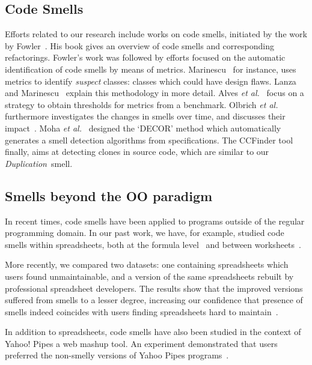 \documentclass{sig-alternate}
\newcommand{\dup}{\emph{Duplication}~}
\begin{document}
\subsection{Code Smells}
Efforts related to our research include works on code smells, initiated by the work by Fowler~\cite{fowler_refactoring:_1999}. His book gives an overview of code smells and corresponding refactorings. Fowler's work was followed by efforts focused on the automatic identification of code smells by means of metrics. Marinescu~\cite{marinescu_detecting_2001} for instance, uses metrics to identify \emph{suspect} classes: classes which could have design flaws. Lanza and Marinescu~\cite{lanza_object-oriented_2006} explain this methodology in more detail. Alves \emph{et al.}~\cite{alves_deriving_2010} focus on a strategy to obtain thresholds for metrics from a benchmark. Olbrich \emph{et al.} furthermore investigates the changes in smells over time, and discusses their impact~\cite{olbrich_evolution_2009}. Moha \emph{et al.}~\cite{moha_decor:_2010} designed the `DECOR' method which automatically generates a smell detection algorithms from specifications. The CCFinder tool~\cite{kamiya_ccfinder:_2002} finally, aims at detecting clones in source code, which are similar to our \dup smell.

\subsection{Smells beyond the OO paradigm}
In recent times, code smells have been applied to programs outside of the regular programming domain. In our past work, we have, for example, studied code smells within spreadsheets, both at the formula level~\cite{hermans_detecting_2014} and between worksheets~\cite{hermans_detecting_2012}.

More recently, we compared two datasets: one containing spreadsheets which users found unmaintainable, and a version of the same spreadsheets rebuilt by professional spreadsheet developers. The results show that the improved versions suffered from smells to a lesser degree, increasing our confidence that presence of smells indeed coincides with users finding spreadsheets hard to maintain~\cite{jansen_code_2015}.

In addition to spreadsheets, code smells have also been studied in the context of Yahoo! Pipes a web mashup tool. An experiment demonstrated that users preferred the non-smelly versions of Yahoo Pipes programs~\cite{stolee_refactoring_2011}. 
\end{document}
